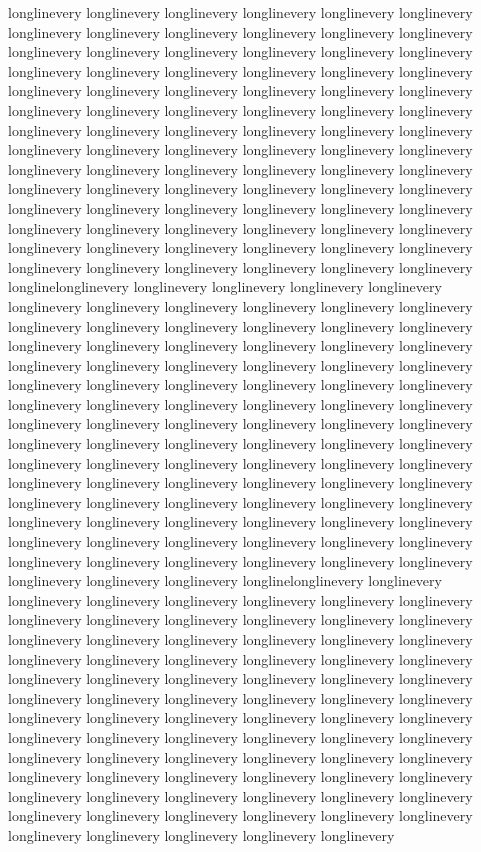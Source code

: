{longlinevery longlinevery longlinevery longlinevery longlinevery longlinevery longlinevery longlinevery longlinevery longlinevery longlinevery longlinevery longlinevery longlinevery longlinevery longlinevery longlinevery longlinevery longlinevery longlinevery longlinevery longlinevery longlinevery longlinevery longlinevery longlinevery longlinevery longlinevery longlinevery longlinevery longlinevery longlinevery longlinevery longlinevery longlinevery longlinevery longlinevery longlinevery longlinevery longlinevery longlinevery longlinevery longlinevery longlinevery longlinevery longlinevery longlinevery longlinevery longlinevery longlinevery longlinevery longlinevery longlinevery longlinevery longlinevery longlinevery longlinevery longlinevery longlinevery longlinevery longlinevery longlinevery longlinevery longlinevery longlinevery longlinevery longlinevery longlinevery longlinevery longlinevery longlinevery longlinevery longlinevery longlinevery longlinevery longlinevery longlinevery longlinevery longlinevery longlinevery longlinevery longlinevery longlinevery longlinevery longlinelonglinevery longlinevery longlinevery longlinevery longlinevery longlinevery longlinevery longlinevery longlinevery longlinevery longlinevery longlinevery longlinevery longlinevery longlinevery longlinevery longlinevery longlinevery longlinevery longlinevery longlinevery longlinevery longlinevery longlinevery longlinevery longlinevery longlinevery longlinevery longlinevery longlinevery longlinevery longlinevery longlinevery longlinevery longlinevery longlinevery longlinevery longlinevery longlinevery longlinevery longlinevery longlinevery longlinevery longlinevery longlinevery longlinevery longlinevery longlinevery longlinevery longlinevery longlinevery longlinevery longlinevery longlinevery longlinevery longlinevery longlinevery longlinevery longlinevery longlinevery longlinevery longlinevery longlinevery longlinevery longlinevery longlinevery longlinevery longlinevery longlinevery longlinevery longlinevery longlinevery longlinevery longlinevery longlinevery longlinevery longlinevery longlinevery longlinevery longlinevery longlinevery longlinevery longlinevery longlinevery longlinevery longlinevery longlinevery longlinevery longlinevery longlinevery longlinevery longlinevery longlinelonglinevery longlinevery longlinevery longlinevery longlinevery longlinevery longlinevery longlinevery longlinevery longlinevery longlinevery longlinevery longlinevery longlinevery longlinevery longlinevery longlinevery longlinevery longlinevery longlinevery longlinevery longlinevery longlinevery longlinevery longlinevery longlinevery longlinevery longlinevery longlinevery longlinevery longlinevery longlinevery longlinevery longlinevery longlinevery longlinevery longlinevery longlinevery longlinevery longlinevery longlinevery longlinevery longlinevery longlinevery longlinevery longlinevery longlinevery longlinevery longlinevery longlinevery longlinevery longlinevery longlinevery longlinevery longlinevery longlinevery longlinevery longlinevery longlinevery longlinevery longlinevery longlinevery longlinevery longlinevery longlinevery longlinevery longlinevery longlinevery longlinevery longlinevery longlinevery longlinevery longlinevery longlinevery longlinevery longlinevery longlinevery longlinevery longlinevery }
